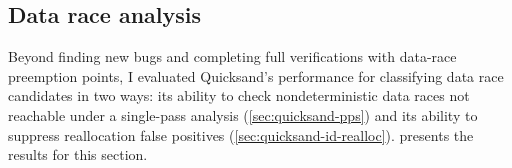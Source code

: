 
\subsection{Data race analysis}
\label{sec:quicksand-eval-nondets}

Beyond finding new bugs and completing full verifications with data-race preemption points,
I evaluated Quicksand's performance for classifying data race candidates in two ways:
its ability to check nondeterministic data races not reachable under a single-pass analysis (\cref{sec:quicksand-pps})
and its ability to suppress reallocation false positives (\cref{sec:quicksand-id-realloc}).
 presents the results for this section.

